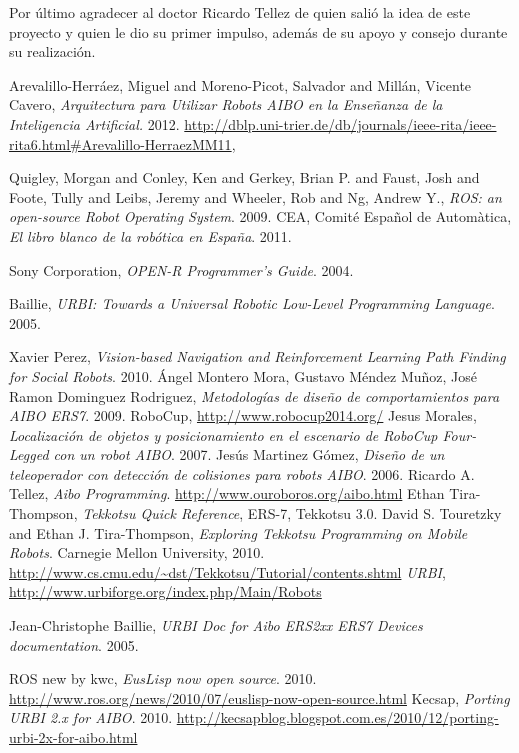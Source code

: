 \documentclass[12pt,a4paper,final,twoside]{book}
\begin{document}
Por último agradecer al doctor Ricardo Tellez de quien salió la idea de este proyecto y quien le dio su primer impulso, además de su apoyo y consejo durante su realización.
\newpage
\clearpage
{}
\thispagestyle{fancy}
\begin{thebibliography}{99}

	Arevalillo-Herráez, Miguel and Moreno-Picot, Salvador and Millán, Vicente Cavero,
	\emph{Arquitectura para Utilizar Robots AIBO en la Enseñanza de la Inteligencia Artificial.}
	2012.
	\url{http://dblp.uni-trier.de/db/journals/ieee-rita/ieee-rita6.html#Arevalillo-HerraezMM11},
	
	Quigley, Morgan and Conley, Ken and Gerkey, Brian P. and Faust, Josh and Foote, Tully and Leibs, Jeremy and Wheeler, Rob and Ng, Andrew Y.,
	\emph{ROS: an open-source Robot Operating System}.
	2009.
	CEA, Comité Español de Automàtica,
	\emph{El libro blanco de la robótica en España}.
	2011.
	
  Sony Corporation,
  \emph{OPEN-R Programmer's Guide}.
  2004.

	Baillie,
	\emph{URBI: Towards a Universal Robotic Low-Level Programming Language}.
	2005.
	
	Xavier Perez,
	\emph{Vision-based Navigation and Reinforcement Learning Path Finding for Social Robots}.
	2010.
	Ángel Montero Mora, Gustavo Méndez Muñoz, José Ramon Dominguez Rodriguez,
	\emph{Metodologías de diseño de comportamientos para AIBO ERS7}.
	2009.
	RoboCup, \url{http://www.robocup2014.org/}
	Jesus Morales,
	\emph{Localización de objetos y posicionamiento en el escenario de RoboCup Four-Legged con un robot AIBO}.
	2007.  
	Jesús Martinez Gómez, 
	\emph{Diseño de un teleoperador con detección de colisiones para robots AIBO}. 			2006.
	Ricardo A. Tellez,
	\emph{Aibo Programming}.
	\url{http://www.ouroboros.org/aibo.html}
	Ethan Tira-Thompson,
	\emph{Tekkotsu Quick Reference}, ERS-7, Tekkotsu 3.0.
	David S. Touretzky and Ethan J. Tira-Thompson, 
	\emph{Exploring Tekkotsu Programming on Mobile Robots}.
	Carnegie Mellon University,
	2010.
	\url{http://www.cs.cmu.edu/~dst/Tekkotsu/Tutorial/contents.shtml}
	\emph{URBI},
	\url{http://www.urbiforge.org/index.php/Main/Robots}
	
	Jean-Christophe Baillie,
	\emph{URBI Doc for Aibo ERS2xx ERS7 Devices documentation}.
	2005.

	ROS new by kwc,
	\emph{EusLisp now open source}.
	2010.
	\url{http://www.ros.org/news/2010/07/euslisp-now-open-source.html}
	Kecsap,
	\emph{Porting URBI 2.x for AIBO}.
	2010.
	\url{http://kecsapblog.blogspot.com.es/2010/12/porting-urbi-2x-for-aibo.html}
	
	
\end{thebibliography}
\end{document}
